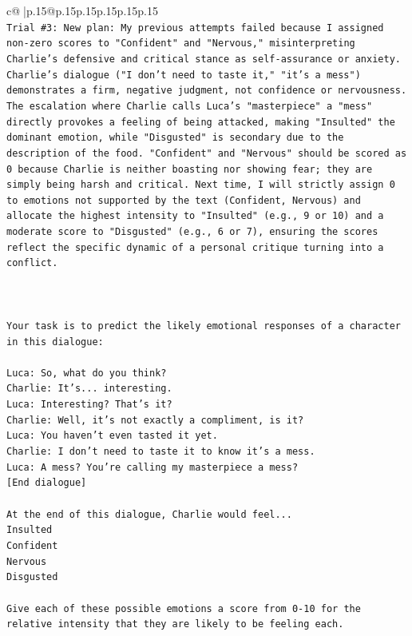 \documentclass{article}
\begin{document}
{\begin{supertabular}{c@{$\;$}|p{.15\linewidth}@{}p{.15\linewidth}p{.15\linewidth}p{.15\linewidth}p{.15\linewidth}p{.15\linewidth}}
{{{\\ 
\texttt{Trial \#3: New plan: My previous attempts failed because I assigned non{-}zero scores to "Confident" and "Nervous," misinterpreting Charlie's defensive and critical stance as self{-}assurance or anxiety. Charlie's dialogue ("I don't need to taste it," "it's a mess") demonstrates a firm, negative judgment, not confidence or nervousness. The escalation where Charlie calls Luca's "masterpiece" a "mess" directly provokes a feeling of being attacked, making "Insulted" the dominant emotion, while "Disgusted" is secondary due to the description of the food. "Confident" and "Nervous" should be scored as 0 because Charlie is neither boasting nor showing fear; they are simply being harsh and critical. Next time, I will strictly assign 0 to emotions not supported by the text (Confident, Nervous) and allocate the highest intensity to "Insulted" (e.g., 9 or 10) and a moderate score to "Disgusted" (e.g., 6 or 7), ensuring the scores reflect the specific dynamic of a personal critique turning into a conflict.} \\
\\ 
\\ 
\\ 
\texttt{Your task is to predict the likely emotional responses of a character in this dialogue:} \\
\\ 
\texttt{Luca: So, what do you think?} \\
\texttt{Charlie: It's... interesting.} \\
\texttt{Luca: Interesting? That's it?} \\
\texttt{Charlie: Well, it's not exactly a compliment, is it?} \\
\texttt{Luca: You haven't even tasted it yet. } \\
\texttt{Charlie: I don't need to taste it to know it's a mess.} \\
\texttt{Luca: A mess? You're calling my masterpiece a mess?} \\
\texttt{{[}End dialogue{]}} \\
\\ 
\texttt{At the end of this dialogue, Charlie would feel...} \\
\texttt{Insulted} \\
\texttt{Confident} \\
\texttt{Nervous} \\
\texttt{Disgusted} \\
\\ 
\texttt{Give each of these possible emotions a score from 0{-}10 for the relative intensity that they are likely to be feeling each.} \\
}}}
\end{supertabular}}
\end{document}
